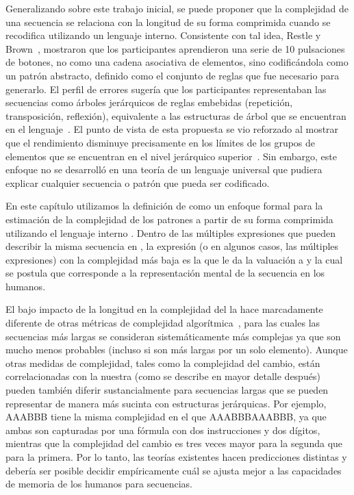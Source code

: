 Generalizando sobre este trabajo inicial, se puede proponer que la complejidad de una secuencia se relaciona con la longitud de su forma comprimida cuando se recodifica utilizando un lenguaje interno. Consistente con tal idea, Restle y Brown~\cite{f36}, mostraron que los participantes aprendieron una serie de 10 pulsaciones de botones, no como una cadena asociativa de elementos, sino codificándola como un patrón abstracto, definido como el conjunto de reglas que fue necesario para generarlo. El perfil de errores sugería que los participantes representaban las secuencias como árboles jerárquicos de reglas embebidas (repetición, transposición, reflexión), equivalente a las estructuras de árbol que se encuentran en el lenguaje~\cite{f37}. El punto de vista de esta propuesta se vio reforzado al mostrar que el rendimiento disminuye precisamente en los límites de los grupos de elementos que se encuentran en el nivel jerárquico superior~\cite{f36,f37,f38}. Sin embargo, este enfoque no se desarrolló en una teoría de un lenguaje universal que pudiera explicar cualquier secuencia o patrón que pueda ser codificado.

En este capítulo utilizamos la definición de \mdlbin como un enfoque formal para la estimación de la complejidad de los patrones a partir de su forma comprimida utilizando el lenguaje interno \grambin. Dentro de las múltiples expresiones que pueden describir la misma secuencia en \grambin, la expresión (o en algunos casos, las múltiples expresiones) con la complejidad más baja es la que le da la valuación a \mdlbin y la cual se postula que corresponde a la representación mental de la secuencia en los humanos. 

El bajo impacto de la longitud en la complejidad del \lot la hace marcadamente diferente de otras métricas de complejidad algorítmica~\cite{f43,f44,f46}, para las cuales las secuencias más largas se consideran sistemáticamente más complejas ya que son mucho menos probables (incluso si son más largas por un solo elemento). Aunque otras medidas de complejidad, tales como la complejidad del cambio, están correlacionadas con la nuestra (como se describe en mayor detalle después) pueden también diferir sustancialmente para secuencias largas que se pueden representar de manera más sucinta con estructuras jerárquicas. Por ejemplo, AAABBB tiene la misma complejidad en el \lot que AAABBBAAABBB, ya que ambas son capturadas por una fórmula con dos instrucciones y dos dígitos, mientras que la complejidad del cambio es tres veces mayor para la segunda que para la primera. Por lo tanto, las teorías existentes hacen predicciones distintas y debería ser posible decidir empíricamente cuál se ajusta mejor a las capacidades de memoria de los humanos para secuencias. 


